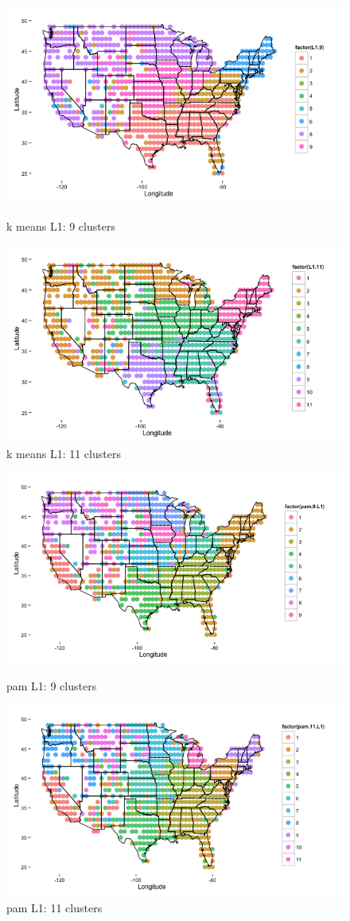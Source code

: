 \documentclass{article}\usepackage[]{graphicx}\usepackage[]{color}
\begin{document}
\begin{figure}[H]
\begin{minipage}{.5\textwidth}
\includegraphics[width=250pts, height=150pts]{L1_9.png}
\caption{k means L1: 9 clusters}
\end{minipage}
\begin{minipage}{.5\textwidth}
\includegraphics[width=250pts, height=150pts]{L1_11.png}
\caption{k means L1: 11 clusters}
\end{minipage}

\end{figure}

\begin{figure}[H]
\begin{minipage}{.5\textwidth}
\includegraphics[width=250pts, height=150pts]{pam9.png}
\caption{pam L1: 9 clusters}
\end{minipage}
\begin{minipage}{.5\textwidth}
\includegraphics[width=250pts, height=150pts]{pam11.png}
\caption{pam L1: 11 clusters}
\end{minipage}

\end{figure}
\end{document}
